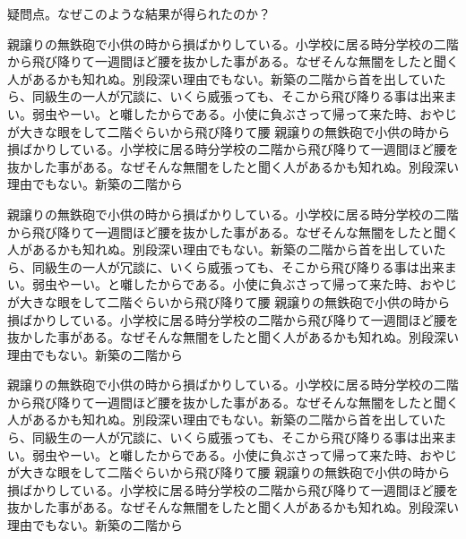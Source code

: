 \begin{question}
    疑問点。なぜこのような結果が得られたのか？
\end{question}

親譲りの無鉄砲で小供の時から損ばかりしている。小学校に居る時分学校の二階から飛び降りて一週間ほど腰を抜かした事がある。なぜそんな無闇をしたと聞く人があるかも知れぬ。別段深い理由でもない。新築の二階から首を出していたら、同級生の一人が冗談に、いくら威張っても、そこから飛び降りる事は出来まい。弱虫やーい。と囃したからである。小使に負ぶさって帰って来た時、おやじが大きな眼をして二階ぐらいから飛び降りて腰
親譲りの無鉄砲で小供の時から損ばかりしている。小学校に居る時分学校の二階から飛び降りて一週間ほど腰を抜かした事がある。なぜそんな無闇をしたと聞く人があるかも知れぬ。別段深い理由でもない。新築の二階から

親譲りの無鉄砲で小供の時から損ばかりしている。小学校に居る時分学校の二階から飛び降りて一週間ほど腰を抜かした事がある。なぜそんな無闇をしたと聞く人があるかも知れぬ。別段深い理由でもない。新築の二階から首を出していたら、同級生の一人が冗談に、いくら威張っても、そこから飛び降りる事は出来まい。弱虫やーい。と囃したからである。小使に負ぶさって帰って来た時、おやじが大きな眼をして二階ぐらいから飛び降りて腰
親譲りの無鉄砲で小供の時から損ばかりしている。小学校に居る時分学校の二階から飛び降りて一週間ほど腰を抜かした事がある。なぜそんな無闇をしたと聞く人があるかも知れぬ。別段深い理由でもない。新築の二階から

親譲りの無鉄砲で小供の時から損ばかりしている。小学校に居る時分学校の二階から飛び降りて一週間ほど腰を抜かした事がある。なぜそんな無闇をしたと聞く人があるかも知れぬ。別段深い理由でもない。新築の二階から首を出していたら、同級生の一人が冗談に、いくら威張っても、そこから飛び降りる事は出来まい。弱虫やーい。と囃したからである。小使に負ぶさって帰って来た時、おやじが大きな眼をして二階ぐらいから飛び降りて腰
親譲りの無鉄砲で小供の時から損ばかりしている。小学校に居る時分学校の二階から飛び降りて一週間ほど腰を抜かした事がある。なぜそんな無闇をしたと聞く人があるかも知れぬ。別段深い理由でもない。新築の二階から

